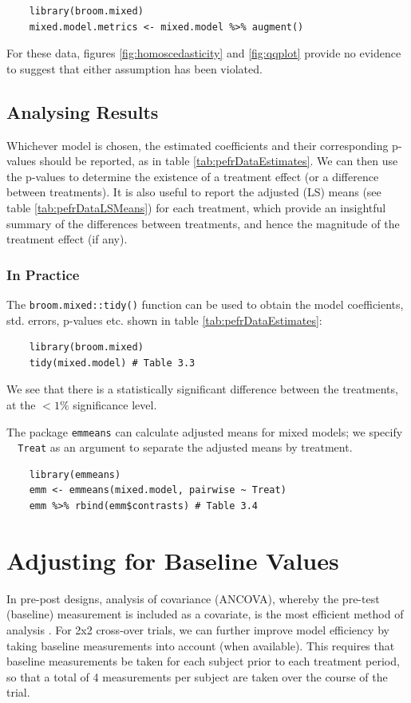 \documentclass[12pt, TexShade, letterpaper]{report}
\begin{document}
\begin{verbatim}
    library(broom.mixed)
    mixed.model.metrics <- mixed.model %>% augment()
\end{verbatim}

For these data, figures \ref{fig:homoscedasticity} and \ref{fig:qqplot} provide no evidence to suggest that either assumption has been violated.

\subsection{Analysing Results}
Whichever model is chosen, the estimated coefficients and their corresponding p-values should be reported, as in table \ref{tab:pefrDataEstimates}. We can then use the p-values to determine the existence of a treatment effect (or a difference between treatments). It is also useful to report the adjusted (LS) means (see table \ref{tab:pefrDataLSMeans}) for each treatment, which provide an insightful summary of the differences between treatments, and hence the magnitude of the treatment effect (if any).




\subsubsection{In Practice}
The \texttt{broom.mixed::tidy()} function can be used to obtain the model coefficients, std. errors, p-values etc. shown in table \ref{tab:pefrDataEstimates}:
\begin{verbatim}
    library(broom.mixed)
    tidy(mixed.model) # Table 3.3
\end{verbatim}
We see that there is a statistically significant difference between the treatments, at the $<1\%$ significance level.

The package \texttt{emmeans} can calculate adjusted means for mixed models; we specify \texttt{~ Treat} as an argument to separate the adjusted means by treatment.
\begin{verbatim}
    library(emmeans)
    emm <- emmeans(mixed.model, pairwise ~ Treat)
    emm %>% rbind(emm$contrasts) # Table 3.4
\end{verbatim}

\section{Adjusting for Baseline Values}
In pre-post designs, analysis of covariance (ANCOVA), whereby the pre-test (baseline) measurement is included as a covariate, is the most efficient method of analysis \cite{wan2021statistical}. For 2x2 cross-over trials, we can further improve model efficiency by taking baseline measurements into account (when available). This requires that baseline measurements be taken for each subject prior to each treatment period, so that a total of 4 measurements per subject are taken over the course of the trial.
\end{document}
